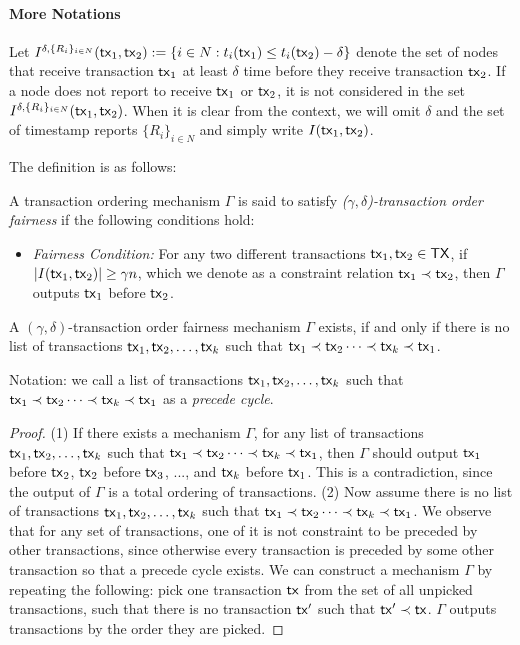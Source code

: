 \documentclass[runningheads]{llncs}
\begin{document}
\paragraph{More Notations} Let $I^{\delta,\{R_i\}_{i\in N}}(\mathsf{tx}_1, \mathsf{tx}_2):=\{i\in N: t_i(\mathsf{tx}_1) \le t_i(\mathsf{tx}_2)-\delta \}$ denote the set of nodes that receive transaction $\mathsf{tx}_1$ at least $\delta$ time before they receive transaction $\mathsf{tx}_2$. If a node does not report to receive $\mathsf{tx}_1$ or $\mathsf{tx}_2$, it is not considered in the set $I^{\delta,\{R_i\}_{i\in N}}(\mathsf{tx}_1, \mathsf{tx}_2)$. When it is clear from the context, we will omit $\delta$ and the set of timestamp reports $\{R_i\}_{i\in N}$ and simply write $I(\mathsf{tx}_1, \mathsf{tx}_2)$.

The definition is as follows: 
\begin{definition}
A transaction ordering mechanism $\Gamma$ is said to satisfy \emph{($\gamma,\delta$)-transaction order fairness} if the following conditions hold:
\begin{itemize}
\item \emph{Fairness Condition:} For any two different transactions $\mathsf{tx}_1, \mathsf{tx}_2\in \mathsf{TX}$, if $|I(\mathsf{tx}_1, \mathsf{tx}_2)|\ge \gamma n$, which we denote as a constraint relation $\mathsf{tx}_1\prec \mathsf{tx}_2$, then $\Gamma$ outputs $\mathsf{tx}_1$ before $\mathsf{tx}_2$.
\end{itemize}
\end{definition}


\begin{lemma}
A $(\gamma,\delta)$-transaction order fairness mechanism $\Gamma$ exists, if and only if there is no list of transactions $\mathsf{tx}_1, \mathsf{tx}_2,\dots, \mathsf{tx}_k$ such that $\mathsf{tx}_1\prec \mathsf{tx}_2\cdots \prec \mathsf{tx}_k \prec \mathsf{tx}_1$. 
\end{lemma}

Notation: we call a list of transactions $\mathsf{tx}_1, \mathsf{tx}_2,\dots, \mathsf{tx}_k$ such that $\mathsf{tx}_1\prec \mathsf{tx}_2\cdots \prec \mathsf{tx}_k \prec \mathsf{tx}_1$ as a \emph{precede cycle}.

\begin{proof} 
    (1) If there exists a mechanism $\Gamma$, for any list of transactions $\mathsf{tx}_1, \mathsf{tx}_2,\dots, \mathsf{tx}_k$ such that $\mathsf{tx}_1\prec \mathsf{tx}_2\cdots \prec \mathsf{tx}_k \prec \mathsf{tx}_1$, then $\Gamma$ should output $\mathsf{tx}_1$ before $\mathsf{tx}_2$, $\mathsf{tx}_2$ before $\mathsf{tx}_3$, ..., and $\mathsf{tx}_k$ before $\mathsf{tx}_1$. This is a contradiction, since the output of $\Gamma$ is a total ordering of transactions.
    (2) Now assume there is no list of transactions $\mathsf{tx}_1, \mathsf{tx}_2,\dots, \mathsf{tx}_k$ such that $\mathsf{tx}_1\prec \mathsf{tx}_2\cdots \prec \mathsf{tx}_k \prec \mathsf{tx}_1$. We observe that for any set of transactions, one of it is not constraint to be preceded by other transactions, since otherwise every transaction is preceded by some other transaction so that a precede cycle exists. We can construct a mechanism $\Gamma$ by repeating the following: pick one transaction $\mathsf{tx}$ from the set of all unpicked transactions, such that there is no transaction $\mathsf{tx}'$ such that $\mathsf{tx}'\prec \mathsf{tx}$. $\Gamma$ outputs transactions by the order they are picked. 
\end{proof}
\end{document}
